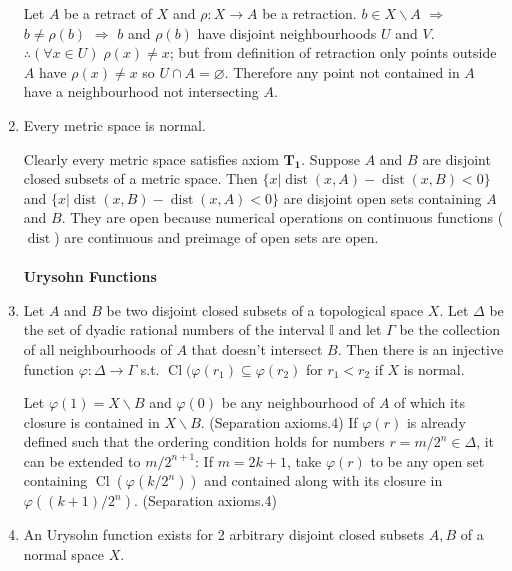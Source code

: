 \documentclass{article}
\DeclareMathOperator{\Cl}{Cl}
\DeclareMathOperator{\dist}{dist}
\begin{document}
\begin{enumerate}
Let \(A\) be a retract of \(X\) and \(\rho:X\to A\) be a retraction. \(b\in X\backslash A\) \(\Longrightarrow\) \(b\neq\rho(b)\) \(\Longrightarrow\) \(b\) and \(\rho(b)\) have disjoint neighbourhoods \(U\) and \(V\).
\(\therefore(\forall x\in U)\;\rho(x)\neq x\); but from definition of retraction only points outside \(A\) have \(\rho(x)\neq x\) so \(U\cap A=\varnothing\). Therefore any point not contained in \(A\) have a neighbourhood not intersecting \(A\).
\item Every metric space is normal.

Clearly every metric space satisfies axiom \(\mathbf{T_{1}}\). Suppose \(A\) and \(B\) are disjoint closed subsets of a metric space.
Then \(\{x|\dist(x,A)-\dist(x,B)<0\}\) and \(\{x|\dist(x,B)-\dist(x,A)<0\}\) are disjoint open sets containing \(A\) and \(B\). 
They are open because numerical operations on continuous functions (\(\dist\)) are continuous and preimage of open sets are open.
\\\\
\textbf{Urysohn Functions}
\item Let \(A\) and \(B\) be two disjoint closed subsets of a topological space \(X\). Let \(\Delta\) be the set of dyadic rational numbers of the interval \(\mathbb{I}\) and let \(\Gamma\) be the collection of all neighbourhoods of \(A\) that doesn't intersect \(B\).
Then there is an injective function \(\varphi:\Delta\to\Gamma\) s.t. \(\Cl(\varphi(r_{1})\subseteq\varphi(r_{2})\) for \(r_{1}<r_{2}\) if \(X\) is normal.

Let \(\varphi(1)=X\backslash B\) and \(\varphi(0)\) be any neighbourhood of \(A\) of which its closure is contained in \(X\backslash B\). \color{gray}(Separation axioms.4) \color{black}
If \(\varphi(r)\) is already defined such that the ordering condition holds for numbers \(r=m/2^{n}\in\Delta\), it can be extended to \(m/2^{n+1}\):
If \(m=2k+1\), take \(\varphi(r)\) to be any open set containing \(\Cl(\varphi(k/2^{n}))\) and contained along with its closure in \(\varphi((k+1)/2^{n})\). \color{gray}(Separation axioms.4) \color{black}
\item An Urysohn function exists for 2 arbitrary disjoint closed subsets \(A, B\) of a normal space \(X\).


\end{enumerate}
\end{document}
